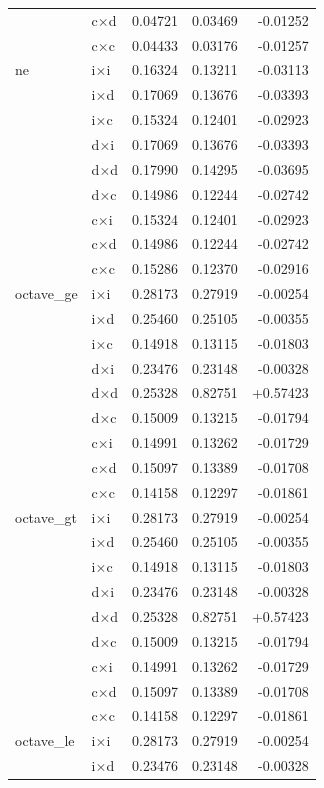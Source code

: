 \begin{longtable}{l l r r r}
   & c×d & 0.04721 & 0.03469 & -0.01252 \\
   & c×c & 0.04433 & 0.03176 & -0.01257 \\
\midrule
  ne & i×i & 0.16324 & 0.13211 & -0.03113 \\
   & i×d & 0.17069 & 0.13676 & -0.03393 \\
   & i×c & 0.15324 & 0.12401 & -0.02923 \\
   & d×i & 0.17069 & 0.13676 & -0.03393 \\
   & d×d & 0.17990 & 0.14295 & -0.03695 \\
   & d×c & 0.14986 & 0.12244 & -0.02742 \\
   & c×i & 0.15324 & 0.12401 & -0.02923 \\
   & c×d & 0.14986 & 0.12244 & -0.02742 \\
   & c×c & 0.15286 & 0.12370 & -0.02916 \\
\midrule
  octave\_ge & i×i & 0.28173 & 0.27919 & -0.00254 \\
   & i×d & 0.25460 & 0.25105 & -0.00355 \\
   & i×c & 0.14918 & 0.13115 & -0.01803 \\
   & d×i & 0.23476 & 0.23148 & -0.00328 \\
   & d×d & 0.25328 & 0.82751 & +0.57423 \\
   & d×c & 0.15009 & 0.13215 & -0.01794 \\
   & c×i & 0.14991 & 0.13262 & -0.01729 \\
   & c×d & 0.15097 & 0.13389 & -0.01708 \\
   & c×c & 0.14158 & 0.12297 & -0.01861 \\
\midrule
  octave\_gt & i×i & 0.28173 & 0.27919 & -0.00254 \\
   & i×d & 0.25460 & 0.25105 & -0.00355 \\
   & i×c & 0.14918 & 0.13115 & -0.01803 \\
   & d×i & 0.23476 & 0.23148 & -0.00328 \\
   & d×d & 0.25328 & 0.82751 & +0.57423 \\
   & d×c & 0.15009 & 0.13215 & -0.01794 \\
   & c×i & 0.14991 & 0.13262 & -0.01729 \\
   & c×d & 0.15097 & 0.13389 & -0.01708 \\
   & c×c & 0.14158 & 0.12297 & -0.01861 \\
\midrule
  octave\_le & i×i & 0.28173 & 0.27919 & -0.00254 \\
   & i×d & 0.23476 & 0.23148 & -0.00328 \\

\end{longtable}
